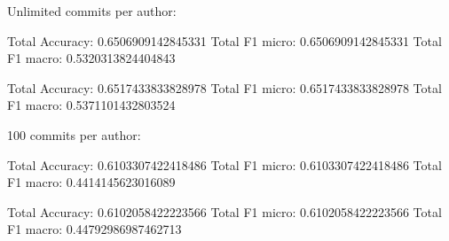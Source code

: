 Unlimited commits per author:

Total Accuracy: 0.6506909142845331
Total F1 micro: 0.6506909142845331
Total F1 macro: 0.5320313824404843

Total Accuracy: 0.6517433833828978
Total F1 micro: 0.6517433833828978
Total F1 macro: 0.5371101432803524

100 commits per author:

Total Accuracy: 0.6103307422418486
Total F1 micro: 0.6103307422418486
Total F1 macro: 0.4414145623016089

Total Accuracy: 0.6102058422223566
Total F1 micro: 0.6102058422223566
Total F1 macro: 0.44792986987462713

